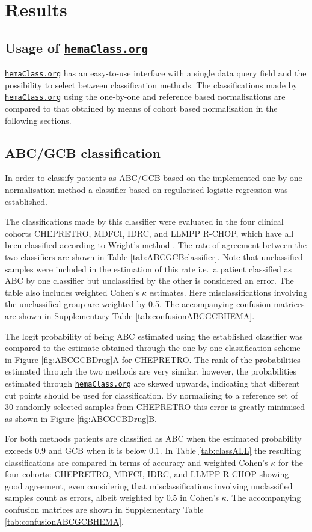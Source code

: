 \documentclass{article}
\newcommand{\hemaClass}{\href{http://hemaClass.org}{\texttt{hemaClass.org}}}
\begin{document}
\section{Results}
\subsection{Usage of \hemaClass{}}
\hemaClass{} has an easy-to-use interface with a single data query field and the possibility to select between classification methods.
The classifications made by \hemaClass{} using the one-by-one and reference based normalisations are compared to that obtained by means of cohort based normalisation in the following sections.

\subsection{ABC/GCB classification}
In order to classify patients as ABC/GCB based on the implemented one-by-one normalisation method a classifier based on regularised logistic regression was established.

The classifications made by this classifier were evaluated in the four clinical cohorts CHEPRETRO, MDFCI, IDRC, and LLMPP R-CHOP, which have all been classified according to Wright's method \citep{Wright2003,Lenz2008a}.
The rate of agreement between the two classifiers are shown in Table \ref{tab:ABCGCBclassifier}.
Note that unclassified samples were included in the estimation of this rate i.e.\ a patient classified as ABC by one classifier but unclassified by the other is considered an error.
The table also includes weighted Cohen's $\kappa$ estimates.
Here misclassifications involving the unclassified group are weighted by 0.5.
The accompanying confusion matrices are shown in Supplementary Table \ref{tab:confusionABCGCBHEMA}.

The logit probability of being ABC estimated using the established classifier was compared to the estimate obtained through the one-by-one classification scheme in Figure \ref{fig:ABCGCBDrug}A for CHEPRETRO.
The rank of the probabilities estimated through the two methods are very similar, however, the probabilities estimated through \hemaClass{} are skewed upwards, indicating that different cut points should be used for classification.
By normalising to a reference set of 30 randomly selected samples from CHEPRETRO this error is greatly minimised as shown in Figure \ref{fig:ABCGCBDrug}B.

For both methods patients are classified as ABC when the estimated probability exceeds 0.9 and GCB when it is below 0.1.
In Table \ref{tab:classALL} the resulting classifications are compared in terms of accuracy and weighted Cohen's $\kappa$ for the four cohorts: CHEPRETRO, MDFCI, IDRC, and LLMPP R-CHOP showing good agreement, even considering that misclassifications involving unclassified samples count as errors, albeit weighted by 0.5 in Cohen's $\kappa$.
The accompanying confusion matrices are shown in Supplementary Table \ref{tab:confusionABCGCBHEMA}.
\end{document}
